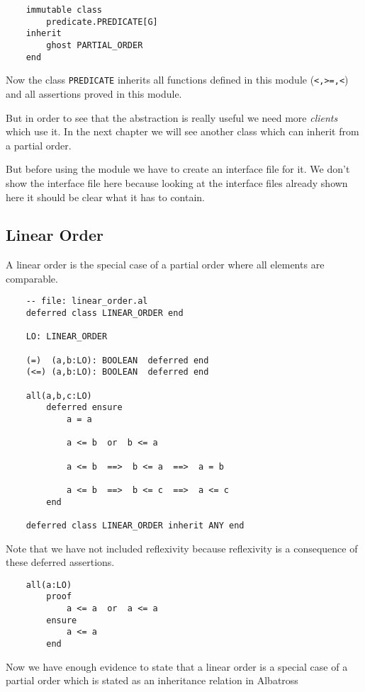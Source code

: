 \begin{lstlisting}
    immutable class
        predicate.PREDICATE[G]
    inherit
        ghost PARTIAL_ORDER
    end
\end{lstlisting}

Now the class \lstinline!PREDICATE! inherits all functions defined in this
module (\lstinline!<,>=,<!) and all assertions proved in this module.

But in order to see that the abstraction is really useful we need more {\em
  clients} which use it. In the next chapter we will see another class which
can inherit from a partial order.

But before using the module we have to create an interface file for it. We
don't show the interface file here because looking at the interface files
already shown here it should be clear what it has to contain.


\subsection{Linear Order}

A linear order is the special case of a partial order where all elements are
comparable.

\begin{lstlisting}
    -- file: linear_order.al
    deferred class LINEAR_ORDER end

    LO: LINEAR_ORDER

    (=)  (a,b:LO): BOOLEAN  deferred end
    (<=) (a,b:LO): BOOLEAN  deferred end

    all(a,b,c:LO)
        deferred ensure
            a = a

            a <= b  or  b <= a

            a <= b  ==>  b <= a  ==>  a = b

            a <= b  ==>  b <= c  ==>  a <= c
        end

    deferred class LINEAR_ORDER inherit ANY end
\end{lstlisting}

Note that we have not included reflexivity because reflexivity is a
consequence of these deferred assertions.

\begin{lstlisting}
    all(a:LO)
        proof
            a <= a  or  a <= a
        ensure
            a <= a
        end
\end{lstlisting}

Now we have enough evidence to state that a linear order is a special case of
a partial order which is stated as an inheritance relation in Albatross

